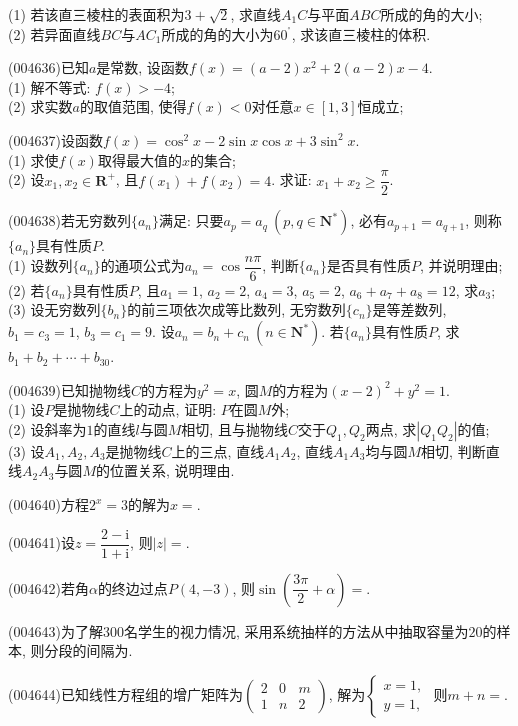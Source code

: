 (1) 若该直三棱柱的表面积为$3+\sqrt 2$, 求直线$A_1C$与平面$ABC$所成的角的大小;\\
(2) 若异面直线$BC$与$AC_1$所成的角的大小为${60}^{^\circ }$, 求该直三棱柱的体积.
\item (004636)已知$a$是常数, 设函数$f(x)=(a-2)x^2+2(a-2)x-4$.\\
(1) 解不等式: $f(x)>-4$;\\
(2) 求实数$a$的取值范围, 使得$f(x)<0$对任意$x\in [1,3]$恒成立;
\item (004637)设函数$f(x)=\cos^2x-2\sin x\cos x+3\sin^2x$.\\
(1) 求使$f(x)$取得最大值的$x$的集合;\\
(2) 设$x_1,x_2\in \mathbf{R}^+$, 且$f(x_1)+f(x_2)=4$. 求证: $x_1+x_2\ge \dfrac{\pi}2$.
\item (004638)若无穷数列$\{a_n\}$满足: 只要$a_p=a_q \ (p,q\in \mathbf{N}^*)$, 必有$a_{p+1}=a_{q+1}$, 则称$\{a_n\}$具有性质$P$.\\
(1) 设数列$\{a_n\}$的通项公式为$a_n=\cos \dfrac{n\pi}{6}$, 判断$\{a_n\}$是否具有性质$P$, 并说明理由;\\
(2) 若$\{a_n\}$具有性质$P$, 且$a_1=1$, $a_2=2$, $a_4=3$, $a_5=2$, $a_6+a_7+a_8=12$, 求$a_3$;\\
(3) 设无穷数列$\{b_n\}$的前三项依次成等比数列, 无穷数列$\{c_n\}$是等差数列, $b_1=c_3=1$, $b_3=c_1=9$. 设$a_n=b_n+c_n\ (n\in \mathbf{N}^*)$. 若$\{a_n\}$具有性质$P$, 求$b_1+b_2+\cdots+b_{30}$.
\item (004639)已知抛物线$C$的方程为$y^2=x$, 圆$M$的方程为$(x-2)^2+y^2=1$.\\
(1) 设$P$是抛物线$C$上的动点, 证明: $P$在圆$M$外;\\
(2) 设斜率为$1$的直线$l$与圆$M$相切, 且与抛物线$C$交于$Q_1,Q_2$两点, 求$|Q_1Q_2|$的值;\\
(3) 设$A_1,A_2,A_3$是抛物线$C$上的三点, 直线$A_1A_2$, 直线$A_1A_3$均与圆$M$相切, 判断直线$A_2A_3$与圆$M$的位置关系, 说明理由.
\item (004640)方程$2^x=3$的解为$x=$.
\item (004641)设$z=\dfrac{2-\mathrm{i}}{1+\mathrm{i}}$, 则$|z|=$.
\item (004642)若角$\alpha$的终边过点$P(4,-3)$, 则$\sin(\dfrac{3\pi}2+\alpha)=$.
\item (004643)为了解$300$名学生的视力情况, 采用系统抽样的方法从中抽取容量为$20$的样本, 则分段的间隔为.
\item (004644)已知线性方程组的增广矩阵为$\begin{pmatrix}
2 & 0 & m  \\ 1 & n & 2  \end{pmatrix}$, 解为$\begin{cases}
x=1,  \\y=1,  \end{cases}$ 则$m+n=$.
